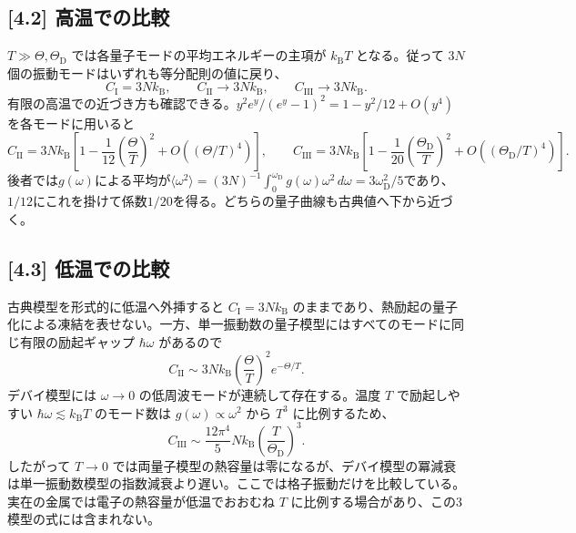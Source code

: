 \documentclass[11pt,a4paper]{article}
\begin{document}
\subsection*{[4.2] 高温での比較}
$T\gg\Theta,\Theta_{\mathrm D}$ では各量子モードの平均エネルギーの主項が $k_{\mathrm B}T$ となる。従って $3N$ 個の振動モードはいずれも等分配則の値に戻り、
\begin{equation}
\boxed{C_{\mathrm I}=3Nk_{\mathrm B},\qquad
C_{\mathrm{II}}\longrightarrow3Nk_{\mathrm B},\qquad
C_{\mathrm{III}}\longrightarrow3Nk_{\mathrm B}}.
\end{equation}
有限の高温での近づき方も確認できる。$y^2e^y/(e^y-1)^2=1-y^2/12+O(y^4)$ を各モードに用いると
\begin{equation}
C_{\mathrm{II}}=3Nk_{\mathrm B}
\left[1-\frac1{12}\left(\frac{\Theta}{T}\right)^2+O\!\left((\Theta/T)^4\right)\right],\qquad
C_{\mathrm{III}}=3Nk_{\mathrm B}
\left[1-\frac1{20}\left(\frac{\Theta_{\mathrm D}}{T}\right)^2+O\!\left((\Theta_{\mathrm D}/T)^4\right)\right].
\end{equation}
後者では$g(\omega)$による平均が$\langle\omega^2\rangle=(3N)^{-1}\int_0^{\omega_{\mathrm D}}g(\omega)\omega^2\,d\omega=3\omega_{\mathrm D}^2/5$であり、$1/12$にこれを掛けて係数$1/20$を得る。どちらの量子曲線も古典値へ下から近づく。

\subsection*{[4.3] 低温での比較}
古典模型を形式的に低温へ外挿すると $C_{\mathrm I}=3Nk_{\mathrm B}$ のままであり、熱励起の量子化による凍結を表せない。一方、単一振動数の量子模型にはすべてのモードに同じ有限の励起ギャップ $\hbar\omega$ があるので
\begin{equation}
\boxed{C_{\mathrm{II}}\sim3Nk_{\mathrm B}
\left(\frac{\Theta}{T}\right)^2e^{-\Theta/T}}.
\end{equation}
デバイ模型には $\omega\to0$ の低周波モードが連続して存在する。温度 $T$ で励起しやすい $\hbar\omega\lesssim k_{\mathrm B}T$ のモード数は $g(\omega)\propto\omega^2$ から $T^3$ に比例するため、
\begin{equation}
\boxed{C_{\mathrm{III}}\sim\frac{12\pi^4}{5}Nk_{\mathrm B}
\left(\frac{T}{\Theta_{\mathrm D}}\right)^3}.
\end{equation}
したがって $T\to0$ では両量子模型の熱容量は零になるが、デバイ模型の冪減衰は単一振動数模型の指数減衰より遅い。ここでは格子振動だけを比較している。実在の金属では電子の熱容量が低温でおおむね $T$ に比例する場合があり、この3模型の式には含まれない。
\end{document}
